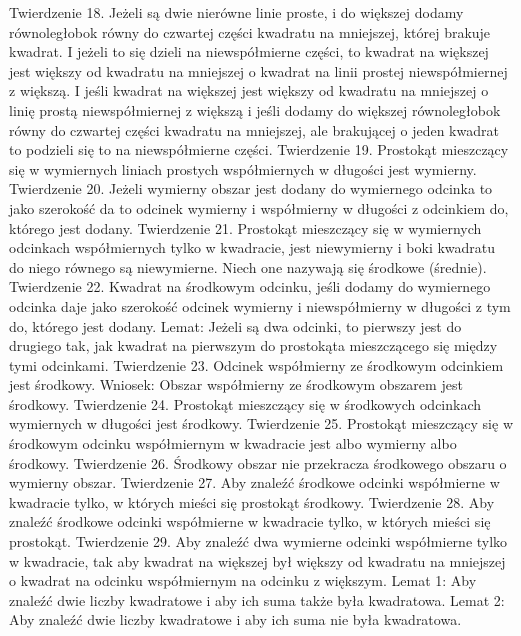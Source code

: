     Twierdzenie 18.
        Jeżeli są dwie nierówne linie proste, i do większej dodamy równoległobok równy do czwartej części kwadratu na mniejszej, której brakuje kwadrat. I jeżeli to się dzieli na niewspółmierne części, to kwadrat na większej jest większy od kwadratu na mniejszej o kwadrat na linii prostej niewspółmiernej z większą. I jeśli kwadrat na większej jest większy od kwadratu na mniejszej o linię prostą niewspółmiernej z większą i jeśli dodamy do większej równoległobok równy do czwartej części kwadratu na mniejszej, ale brakującej o jeden kwadrat to podzieli się to na niewspółmierne części.
    Twierdzenie 19.
        Prostokąt mieszczący się w wymiernych liniach prostych współmiernych w długości jest wymierny.
    Twierdzenie 20.
        Jeżeli wymierny obszar jest dodany do wymiernego odcinka to jako szerokość da to odcinek wymierny i współmierny w długości z odcinkiem do, którego jest dodany.
    Twierdzenie 21.
        Prostokąt mieszczący się w wymiernych odcinkach współmiernych tylko w kwadracie, jest niewymierny i boki kwadratu do niego równego są niewymierne. Niech one nazywają się środkowe (średnie).
    Twierdzenie 22.
        Kwadrat na środkowym odcinku, jeśli dodamy do wymiernego odcinka daje jako szerokość odcinek wymierny i niewspółmierny w długości z tym do, którego jest dodany.
        Lemat:
        Jeżeli są dwa odcinki, to pierwszy jest do drugiego tak, jak kwadrat na pierwszym do prostokąta mieszczącego się między tymi odcinkami.
    Twierdzenie 23.
        Odcinek współmierny ze środkowym odcinkiem jest środkowy.
        Wniosek:
        Obszar współmierny ze środkowym obszarem jest środkowy.
    Twierdzenie 24.
        Prostokąt mieszczący się w środkowych odcinkach wymiernych w długości jest środkowy.
    Twierdzenie 25.
        Prostokąt mieszczący się w środkowym odcinku współmiernym w kwadracie jest albo wymierny albo środkowy.
    Twierdzenie 26.
        Środkowy obszar nie przekracza środkowego obszaru o wymierny obszar. 
    Twierdzenie 27.
        Aby znaleźć środkowe odcinki współmierne w kwadracie tylko, w których mieści się prostokąt środkowy.
    Twierdzenie 28.
        Aby znaleźć środkowe odcinki współmierne w kwadracie tylko, w których mieści się prostokąt.
    Twierdzenie 29.
        Aby znaleźć dwa wymierne odcinki współmierne tylko w kwadracie, tak aby kwadrat na większej był większy od kwadratu na mniejszej o kwadrat na odcinku współmiernym na odcinku z większym.
        Lemat 1:
        Aby znaleźć dwie liczby kwadratowe i aby ich suma także była kwadratowa.
        Lemat 2:
        Aby znaleźć dwie liczby kwadratowe i aby ich suma nie była kwadratowa.
